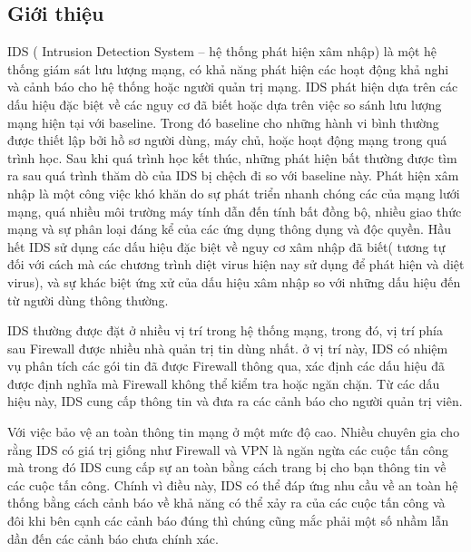 \subsection{Giới thiệu}
IDS ( Intrusion Detection System – hệ thống phát hiện xâm nhập) là một hệ thống giám sát lưu lượng mạng, có khả năng phát hiện các hoạt động khả nghi và cảnh báo cho hệ thống hoặc người quản trị mạng.
IDS phát hiện dựa trên các dấu hiệu đặc biệt về các nguy cơ đã biết hoặc dựa trên việc so sánh lưu lượng mạng hiện tại với baseline.
Trong đó baseline cho những hành vi bình thường được thiết lập bởi hồ sơ người dùng, máy chủ, hoặc hoạt động mạng trong quá trình học.
Sau khi quá trình học kết thúc, những phát hiện bất thường được tìm ra sau quá trình thăm dò của IDS bị chệch đi so với baseline này.
Phát hiện xâm nhập là một công việc khó khăn do sự phát triển nhanh chóng các của mạng lưới mạng, quá nhiều môi trường máy tính dẫn đến tính bất đồng bộ, nhiều giao thức mạng và sự phân loại đáng kể của các ứng dụng thông dụng và độc quyền. 
Hầu hết IDS sử dụng các dấu hiệu đặc biệt về nguy cơ xâm nhập đã biết( tương tự đối với cách mà các chương trình diệt virus hiện nay sử dụng để phát hiện và diệt virus), và sự khác biệt ứng xử của dấu hiệu xâm nhập so với những dấu hiệu đến từ người dùng thông thường.
\par
IDS thường được đặt ở nhiều vị trí trong hệ thống mạng, trong đó, vị trí phía sau Firewall được nhiều nhà quản trị tin dùng nhất. ở vị trí này, IDS có nhiệm vụ phân tích các gói tin đã được Firewall thông qua, xác định các dấu hiệu đã được định nghĩa mà Firewall không thể kiểm tra hoặc ngăn chặn. Từ các dấu hiệu này, IDS cung cấp thông tin và đưa ra các cảnh báo cho người quản trị viên.
\par
Với việc bảo vệ an toàn thông tin mạng ở một mức độ cao. 
Nhiều chuyên gia cho rằng IDS có giá trị giống như Firewall và VPN là ngăn ngừa các cuộc tấn công mà trong đó IDS cung cấp sự an toàn bằng cách trang bị cho bạn thông tin về các cuộc tấn công.
Chính vì điều này, IDS có thể đáp ứng nhu cầu về an toàn hệ thống bằng cách cảnh báo về khả năng có thể xảy ra của các cuộc tấn công và đôi khi bên cạnh các cảnh báo đúng thì chúng cũng mắc phải một số nhầm lẫn dần đến các cảnh báo chưa chính xác.
